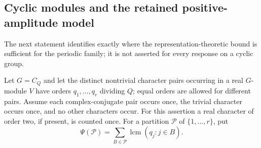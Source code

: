 \subsection{Cyclic modules and the retained positive-amplitude model}
The next statement identifies exactly where the representation-theoretic
bound is sufficient for the periodic family; it is not asserted for every
response on a cyclic group.

Let $G=C_Q$ and let the distinct nontrivial character pairs occurring in a
real $G$-module $V$ have orders $q_1,\ldots,q_r$ dividing $Q$; equal orders
are allowed for different pairs. Assume each complex-conjugate pair occurs
once, the trivial character occurs once, and no other characters occur.
For this assertion a real character of order two, if present, is counted
once. For a partition $\mathcal P$
of $\{1,\ldots,r\}$, put
\[
 \Psi(\mathcal P)=\sum_{B\in\mathcal P}\operatorname{lcm}(q_j:j\in B).
\]

